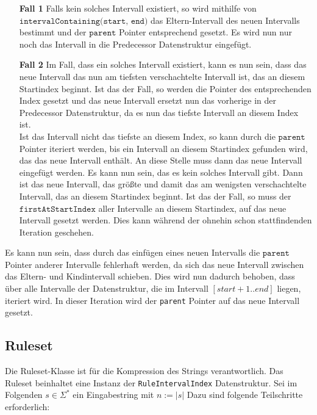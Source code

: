 \begin{itemize}[leftmargin=1.5cm]
    \item[\textbf{Fall 1}] Falls kein solches Intervall existiert, so wird mithilfe von\\
    $\texttt{intervalContaining(start, end)}$ das Eltern-Intervall des neuen Intervalls bestimmt und der $\texttt{parent}$ Pointer entsprechend gesetzt.  Es wird nun nur noch das Intervall in die Predecessor Datenstruktur eingefügt.
    \item[\textbf{Fall 2}] Im Fall, dass ein solches Intervall existiert, kann es nun sein, dass das neue Intervall das nun am tiefsten verschachtelte Intervall ist, das an diesem Startindex beginnt. Ist das der Fall, so werden die Pointer des entsprechenden Index gesetzt und das neue Intervall ersetzt nun das vorherige in der Predecessor Datenstruktur, da es nun das tiefste Intervall an diesem Index ist.\\
    Ist das Intervall nicht das tiefste an diesem Index, so kann durch die $\texttt{parent}$ Pointer iteriert werden, bis ein Intervall an diesem Startindex gefunden wird, das das neue Intervall enthält. An diese Stelle muss dann das neue Intervall eingefügt werden. Es kann nun sein, das es kein solches Intervall gibt. Dann ist das neue Intervall, das größte und damit das am wenigsten verschachtelte Intervall, das an diesem Startindex beginnt. Ist das der Fall, so muss der $\texttt{firstAtStartIndex}$ aller Intervalle an diesem Startindex, auf das neue Intervall gesetzt werden. Dies kann während der ohnehin schon stattfindenden Iteration geschehen. 
\end{itemize} 

Es kann nun sein, dass durch das einfügen eines neuen Intervalls die $\texttt{parent}$ Pointer anderer Intervalle fehlerhaft werden, da sich das neue Intervall zwischen das Eltern- und
Kindintervall schieben. Dies wird nun dadurch behoben, dass über alle Intervalle der Datenstruktur, die im Intervall $[start+1..end]$ liegen, iteriert wird. In dieser Iteration wird der \texttt{parent} Pointer auf das neue Intervall gesetzt. 


\subsection{Ruleset}

Die Ruleset-Klasse ist für die Kompression des Strings verantwortlich. Das Ruleset beinhaltet eine Instanz der \texttt{RuleIntervalIndex} Datenstruktur. Sei im Folgenden $s \in \Sigma^*$ ein Eingabestring mit $n := |s|$ Dazu sind folgende Teilschritte erforderlich:

